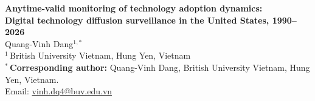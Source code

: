 \documentclass[12pt]{article}
\begin{document}
\begin{center}
{\Large\bfseries Anytime-valid monitoring of technology adoption dynamics:\\[2pt]
Digital technology diffusion surveillance in the United States, 1990--2026}\\[24pt]

{\large Quang-Vinh Dang$^{1,*}$}\\[10pt]

$^{1}$\,British University Vietnam, Hung Yen, Vietnam\\[6pt]

$^{*}$\,\textbf{Corresponding author:} Quang-Vinh Dang, British University Vietnam, Hung Yen, Vietnam.\\
Email: \href{mailto:vinh.dq4@buv.edu.vn}{vinh.dq4@buv.edu.vn}
\end{center}
\end{document}
